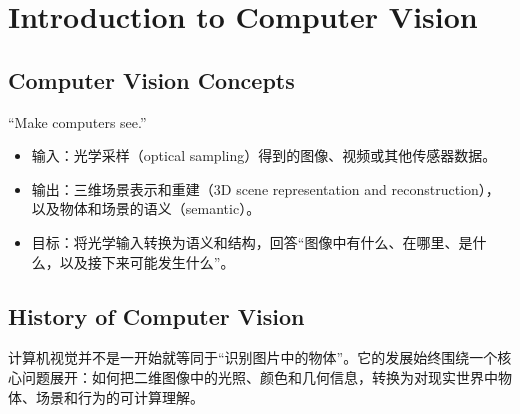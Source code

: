 \section{Introduction to Computer Vision}

\subsection{Computer Vision Concepts}

``Make computers see.''

\begin{itemize}
\item 输入：光学采样（optical sampling）得到的图像、视频或其他传感器数据。
\item 输出：三维场景表示和重建（3D scene representation and reconstruction），以及物体和场景的语义（semantic）。
\item 目标：将光学输入转换为语义和结构，回答“图像中有什么、在哪里、是什么，以及接下来可能发生什么”。
\end{itemize}

\subsection{History of Computer Vision}

计算机视觉并不是一开始就等同于“识别图片中的物体”。它的发展始终围绕一个核心问题展开：如何把二维图像中的光照、颜色和几何信息，转换为对现实世界中物体、场景和行为的可计算理解。

